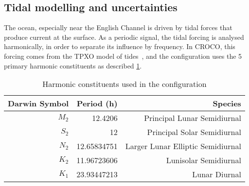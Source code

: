 \documentclass[../../Main_ManuscritThese.tex]{subfiles}
\newcommand{\CROCO}{CROCO}
\begin{document}
\subsection{Tidal modelling and uncertainties}
\label{ssec:tidal_modelling}
The ocean, especially near the English Channel is driven by tidal
forces that produce current at the surface. As a periodic signal, the
tidal forcing is analysed harmonically, in order to separate its
influence by frequency. In \CROCO, this forcing comes from the TPXO
model of tides~\cite{egbert_efficient_2002}, and the configuration uses the 5
primary harmonic constituents as described \cref{tab:tides_components}.
\begin{table}[!h]
  \centering
  \begin{tabular}{rrr}\toprule
    Darwin Symbol & Period (h)   & Species                           \\ \midrule
    $M_2$         & 12.4206      & Principal Lunar Semidiurnal       \\
    $S_2$         & 12           & Principal Solar Semidiurnal       \\
    $N_2$         & 12.65834751  & Larger Lunar Elliptic Semidiurnal \\
    $K_2$         & 11.96723606  & Lunisolar Semidiurnal             \\
    $K_1$         & 23.93447213  & Lunar Diurnal                     \\
    \bottomrule
  \end{tabular}
  \caption{Harmonic constituents used in the configuration}
  \label{tab:tides_components}
\end{table}
\end{document}

